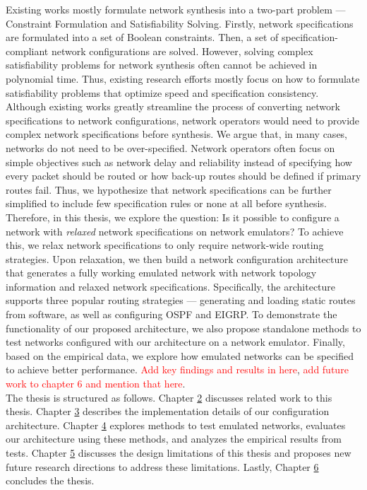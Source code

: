 \documentclass{uiucthesis2021}
\begin{document}
\noindent Existing works mostly formulate network synthesis into a two-part problem --- Constraint Formulation and Satisfiability Solving. Firstly, network specifications are formulated into a set of Boolean constraints. Then, a set of specification-compliant network configurations are solved. However, solving complex satisfiability problems for network synthesis often cannot be achieved in polynomial time. Thus, existing research efforts mostly focus on how to formulate satisfiability problems that optimize speed and specification consistency. Although existing works greatly streamline the process of converting network specifications to network configurations, network operators would need to provide complex network specifications before synthesis. We argue that, in many cases, networks do not need to be over-specified. Network operators often focus on simple objectives such as network delay and reliability instead of specifying how every packet should be routed or how back-up routes should be defined if primary routes fail. Thus, we hypothesize that network specifications can be further simplified to include few specification rules or none at all before synthesis.\\

\noindent Therefore, in this thesis, we explore the question: Is it possible to configure a network with \textit{relaxed} network specifications on network emulators? To achieve this, we relax network specifications to only require network-wide routing strategies. Upon relaxation, we then build a network configuration architecture that generates a fully working emulated network with network topology information and relaxed network specifications. Specifically, the architecture supports three popular routing strategies --- generating and loading static routes from software, as well as configuring OSPF and EIGRP. To demonstrate the functionality of our proposed architecture, we also propose standalone methods to test networks configured with our architecture on a network emulator. Finally, based on the empirical data, we explore how emulated networks can be specified to achieve better performance. \textcolor{red}{Add key findings and results in here}, \textcolor{red}{add future work to chapter 6 and mention that here}.\\

\noindent The thesis is structured as follows. Chapter \hyperref[c2]{2} discusses related work to this thesis. Chapter \hyperref[c3]{3} describes the implementation details of our configuration architecture. Chapter \hyperref[c4]{4} explores methods to test emulated networks, evaluates our architecture using these methods, and analyzes the empirical results from tests. Chapter \hyperref[c5]{5} discusses the design limitations of this thesis and proposes new future research directions to address these limitations. Lastly, Chapter \hyperref[c6]{6} concludes the thesis.\\
\end{document}
